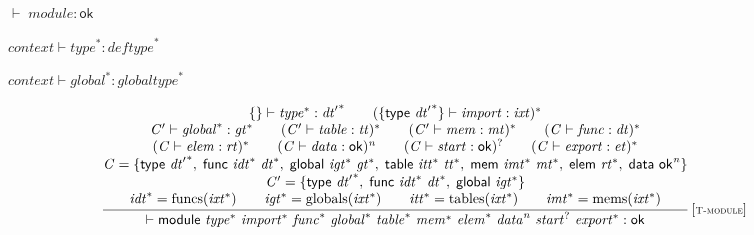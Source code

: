 \vspace{1ex}

$\boxed{{ \vdash }\;{\mathit{module}} : \mathsf{ok}}$

$\boxed{{\mathit{context}} \vdash {{\mathit{type}}^\ast} : {{\mathit{deftype}}^\ast}}$

$\boxed{{\mathit{context}} \vdash {{\mathit{global}}^\ast} : {{\mathit{globaltype}}^\ast}}$

$$
\begin{array}{@{}c@{}}\displaystyle
\frac{
\begin{array}{@{}c@{}}
\{ \begin{array}[t]{@{}l@{}}
 \}\end{array} \vdash {{\mathit{type}}^\ast} : {{\mathit{dt}'}^\ast}
 \qquad
(\{ \begin{array}[t]{@{}l@{}}
\mathsf{type}~{{\mathit{dt}'}^\ast} \}\end{array} \vdash {\mathit{import}} : {\mathit{ixt}})^\ast
 \\
{\mathit{C}'} \vdash {{\mathit{global}}^\ast} : {{\mathit{gt}}^\ast}
 \qquad
({\mathit{C}'} \vdash {\mathit{table}} : {\mathit{tt}})^\ast
 \qquad
({\mathit{C}'} \vdash {\mathit{mem}} : {\mathit{mt}})^\ast
 \qquad
({\mathit{C}} \vdash {\mathit{func}} : {\mathit{dt}})^\ast
 \\
({\mathit{C}} \vdash {\mathit{elem}} : {\mathit{rt}})^\ast
 \qquad
({\mathit{C}} \vdash {\mathit{data}} : \mathsf{ok})^{{\mathit{n}}}
 \qquad
({\mathit{C}} \vdash {\mathit{start}} : \mathsf{ok})^?
 \qquad
({\mathit{C}} \vdash {\mathit{export}} : {\mathit{et}})^\ast
 \\
{\mathit{C}} = \{ \begin{array}[t]{@{}l@{}}
\mathsf{type}~{{\mathit{dt}'}^\ast},\; \mathsf{func}~{{\mathit{idt}}^\ast}~{{\mathit{dt}}^\ast},\; \mathsf{global}~{{\mathit{igt}}^\ast}~{{\mathit{gt}}^\ast},\; \mathsf{table}~{{\mathit{itt}}^\ast}~{{\mathit{tt}}^\ast},\; \mathsf{mem}~{{\mathit{imt}}^\ast}~{{\mathit{mt}}^\ast},\; \mathsf{elem}~{{\mathit{rt}}^\ast},\; \mathsf{data}~{\mathsf{ok}^{{\mathit{n}}}} \}\end{array}
 \\
{\mathit{C}'} = \{ \begin{array}[t]{@{}l@{}}
\mathsf{type}~{{\mathit{dt}'}^\ast},\; \mathsf{func}~{{\mathit{idt}}^\ast}~{{\mathit{dt}}^\ast},\; \mathsf{global}~{{\mathit{igt}}^\ast} \}\end{array}
 \\
{{\mathit{idt}}^\ast} = {\mathrm{funcs}}({{\mathit{ixt}}^\ast})
 \qquad
{{\mathit{igt}}^\ast} = {\mathrm{globals}}({{\mathit{ixt}}^\ast})
 \qquad
{{\mathit{itt}}^\ast} = {\mathrm{tables}}({{\mathit{ixt}}^\ast})
 \qquad
{{\mathit{imt}}^\ast} = {\mathrm{mems}}({{\mathit{ixt}}^\ast})
\end{array}
}{
{ \vdash }\;\mathsf{module}~{{\mathit{type}}^\ast}~{{\mathit{import}}^\ast}~{{\mathit{func}}^\ast}~{{\mathit{global}}^\ast}~{{\mathit{table}}^\ast}~{{\mathit{mem}}^\ast}~{{\mathit{elem}}^\ast}~{{\mathit{data}}^{{\mathit{n}}}}~{{\mathit{start}}^?}~{{\mathit{export}}^\ast} : \mathsf{ok}
} \, {[\textsc{\scriptsize T{-}module}]}
\qquad
\end{array}
$$

